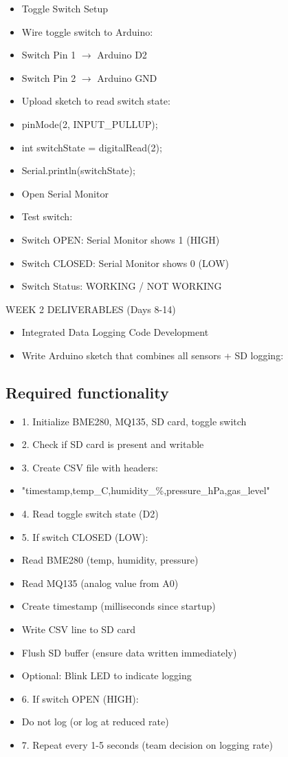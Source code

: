 \documentclass[11pt,letterpaper]{article}
\begin{document}
\begin{itemize}
  \item Toggle Switch Setup
  \item Wire toggle switch to Arduino:
  \item Switch Pin 1 $\rightarrow$ Arduino D2
  \item Switch Pin 2 $\rightarrow$ Arduino GND
  \item Upload sketch to read switch state:
  \item pinMode(2, INPUT\_PULLUP);
  \item int switchState = digitalRead(2);
  \item Serial.println(switchState);
  \item Open Serial Monitor
  \item Test switch:
  \item Switch OPEN: Serial Monitor shows 1 (HIGH)
  \item Switch CLOSED: Serial Monitor shows 0 (LOW)
  \item Switch Status: WORKING / NOT WORKING
\end{itemize}

WEEK 2 DELIVERABLES (Days 8-14)\par

\begin{itemize}
  \item Integrated Data Logging Code Development
  \item Write Arduino sketch that combines all sensors + SD logging:
\end{itemize}

\subsection{Required functionality}

\begin{itemize}
  \item 1. Initialize BME280, MQ135, SD card, toggle switch
  \item 2. Check if SD card is present and writable
  \item 3. Create CSV file with headers:
  \item "timestamp,temp\_C,humidity\_\%,pressure\_hPa,gas\_level"
  \item 4. Read toggle switch state (D2)
  \item 5. If switch CLOSED (LOW):
  \item Read BME280 (temp, humidity, pressure)
  \item Read MQ135 (analog value from A0)
  \item Create timestamp (milliseconds since startup)
  \item Write CSV line to SD card
  \item Flush SD buffer (ensure data written immediately)
  \item Optional: Blink LED to indicate logging
  \item 6. If switch OPEN (HIGH):
  \item Do not log (or log at reduced rate)
  \item 7. Repeat every 1-5 seconds (team decision on logging rate)
\end{itemize}
\end{document}
